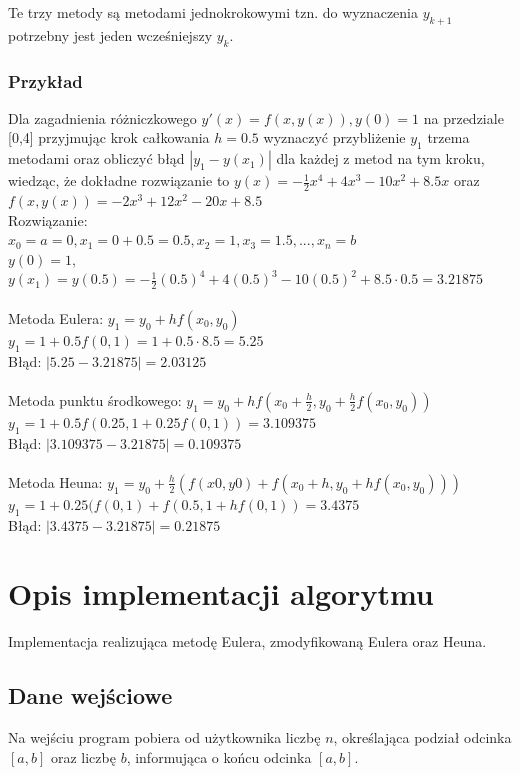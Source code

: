 \documentclass[12pt]{article}
\begin{document}
\begin{enumerate}
Te trzy metody są metodami jednokrokowymi tzn. do wyznaczenia $y_{k+1}$ potrzebny jest jeden wcześniejszy $y_k$.
\end{enumerate}


\subsubsection{Przykład}

Dla zagadnienia różniczkowego $y'(x)= f(x,y(x)), y(0)=1$
na przedziale [0,4] przyjmując krok całkowania $h = 0.5$ wyznaczyć przybliżenie $y_1$ trzema metodami oraz obliczyć błąd  $|y_1-y(x_1)|$ dla każdej z metod na tym kroku, wiedząc, że dokładne rozwiązanie to $y(x)=-\frac{1}{2}x^4+4x^3-10x^2+8.5x$ oraz  $f(x,y(x))=-2x^3+12x^2-20x+8.5 $
\\
Rozwiązanie:
\\$x_0=a=0, x_1=0+0.5=0.5, x_2=1, x_3=1.5,...,x_n=b $
\\
$y(0)=1, $
$y(x_1)=y(0.5)=-\frac{1}{2}(0.5)^4+4(0.5)^3-10(0.5)^2+8.5\cdot0.5=3.21875$
\\
\\Metoda Eulera:
$y_1=y_0+hf(x_0,y_0)$
\\
$y_1=1+0.5f(0,1)=1+0.5 \cdot 8.5 =5.25$
\\
Błąd:
$|5.25-3.21875|=2.03125$
\\ \\Metoda punktu środkowego:
$y_1=y_0+hf(x_0+\frac{h}{2},y_0+\frac{h}{2}f(x_0,y_0))$
\\
$y_1=1+0.5f(0.25,1+0.25f(0,1))=3.109375$
\\
Błąd:
$|3.109375-3.21875|=0.109375$
\\ \\Metoda Heuna:
$y_1=y_0 +\frac{h}{2}(f(x0,y0 )+f(x_0+h,y_0+hf(x_0,y_0)))$
\\
$y_1=1+0.25(f(0,1)+f(0.5,1+hf(0,1))=3.4375$
\\
Błąd:
$|3.4375-3.21875|=0.21875$
\section{Opis implementacji algorytmu}
Implementacja realizująca metodę Eulera, zmodyfikowaną Eulera oraz Heuna.
\subsection{Dane wejściowe}
Na wejściu program pobiera od użytkownika liczbę $n$, określająca podział odcinka $[a, b]$ oraz liczbę $b$, informująca o końcu odcinka $[a, b]$.
\end{document}
